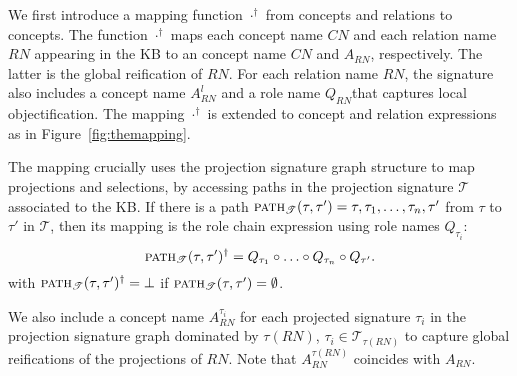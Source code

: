 \documentclass[draft]{article}
\newcommand{\pth}[2]{\ensuremath{\textsc{path}_{\mathscr{T}}(#1,#2)}\xspace}
\newcommand{\chd}[2]{\ensuremath{\textsc{child}_{\mathscr{T}}(#1,#2)}\xspace}
\begin{document}


We first introduce a mapping function $\cdot^\dag$ from \DLRpm
concepts and relations to \ALCQI concepts. 
The function $\cdot^\dag$ maps each
concept name $C\!N$ and each relation name $R\!N$ appearing in the \DLRpm KB to an \ALCQI concept
name $C\!N$ and $A_{R\!N}$, respectively. The latter is the global reification of $R\!N$.
%
For each relation name $R\!N$, the \ALCQI signature also
includes a concept name $A_{R\!N}^{l}$ and a role name $Q_{R\!N}$that captures local objectification. 
The mapping $\cdot^\dag$
is extended to concept and relation expressions as in
Figure~\ref{fig:themapping}.
%

The mapping crucially uses the projection signature graph structure to map projections and selections, by accessing paths in the projection signature $\mathscr{T}$ associated to the \DLRpm KB. If there is a path $\pth{\tau}{\tau'} = \tau,\tau_1,\ldots,\tau_n, \tau'$ from ${\tau}$ to ${\tau'}$ in $\mathscr{T}$, then its mapping is the \ALCQI role chain expression using role names $Q_{\tau_i}$:
%
\[
	\pth{\tau}{\tau'}^\dag = Q_{\tau_1}\chain\ldots\chain Q_{\tau_n}\chain Q_{\tau'}. 
\]
%
with $\pth{\tau}{\tau'}^\dag = \bot$ if $\pth{\tau}{\tau'} = \emptyset$.
%
%

We also include a concept name $A_{R\!N}^{\tau_i}$ for each projected signature $\tau_i$ in the projection signature graph dominated by $\tau(R\!N)$, $\tau_i\in\mathscr{T}_{\tau(R\!N)}$ to capture global reifications of the projections of $R\!N$. Note that $A_{R\!N}^{\tau(R\!N)}$ coincides with $A_{R\!N}$.
\end{document}
